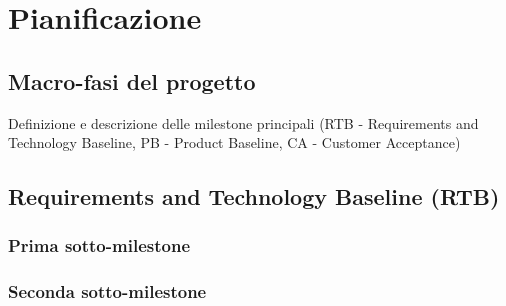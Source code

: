 \documentclass[12pt, a4paper]{article}
\begin{document}
{\section{Pianificazione}

\subsection{Macro-fasi del progetto}

Definizione e descrizione delle milestone principali (RTB - Requirements
and Technology Baseline, PB - Product Baseline, CA - Customer
Acceptance)

\subsection{Requirements and Technology Baseline (RTB)}

\subsubsection{Prima sotto-milestone}

\subsubsection{Seconda sotto-milestone}

}
\end{document}

